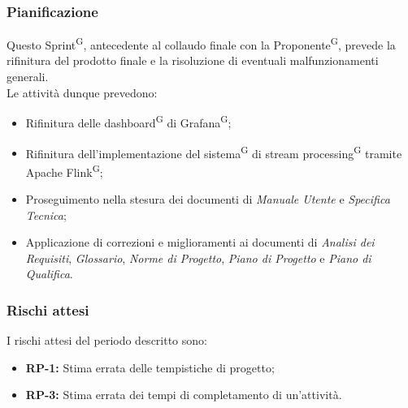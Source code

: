 \documentclass[8pt]{article}
\newcommand{\glossterm}[1]{#1\textsuperscript{G}} %
\begin{document}
\subsubsection{Pianificazione}
Questo \glossterm{Sprint}, antecedente al collaudo finale con la \glossterm{Proponente}, prevede la rifinitura del prodotto finale e la risoluzione di eventuali malfunzionamenti generali.\\Le attività dunque prevedono:
\begin{itemize}
    \item Rifinitura delle \glossterm{dashboard} di \glossterm{Grafana};
    \item Rifinitura dell'implementazione del \glossterm{sistema} di \glossterm{stream processing} tramite Apache \glossterm{Flink};
    \item Proseguimento nella stesura dei documenti di \textit{Manuale Utente} e \textit{Specifica Tecnica};
    \item Applicazione di correzioni e miglioramenti ai documenti di \textit{Analisi dei Requisiti}, \textit{Glossario}, \textit{Norme di Progetto}, \textit{Piano di Progetto} e \textit{Piano di Qualifica}.
\end{itemize} 
\subsubsection{Rischi attesi}
I rischi attesi del periodo descritto sono:
\begin{itemize}
    \setlength\itemsep{0em}
        \item \textbf{RP-1:} Stima errata delle tempistiche di progetto;
        \item \textbf{RP-3:} Stima errata dei tempi di completamento di un'attività.
    \end{itemize}
\clearpage
\end{document}
